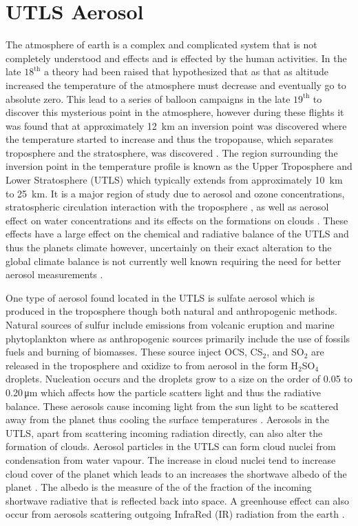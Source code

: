 \section{UTLS Aerosol}

The atmosphere of earth is a complex and complicated system that is not completely understood and effects and is effected by the human activities. In the late $18^{\text{th}}$ a theory had been raised that hypothesized that as that as altitude increased the temperature of the atmosphere must decrease and eventually go to absolute zero. This lead to a series of balloon campaigns in the late $19^{\text{th}}$ to discover this mysterious point in the atmosphere, however during these flights it was found that at approximately 12~km an inversion point was discovered where the temperature started to increase and thus the tropopause, which separates troposphere and the stratosphere, was discovered \citep{Hoinka1997}. The region surrounding the inversion point in the temperature profile is known as the Upper Troposphere and Lower Stratosphere (UTLS) which typically extends from approximately 10~km to 25~km. It is a major region of study due to aerosol and ozone concentrations, stratospheric circulation interaction with the troposphere \citep{Baldwin2007}, as well as aerosol effect on water concentrations and its effects on the formations on clouds \citep{Demott1997}. These effects have a large effect on the chemical and radiative balance of the UTLS and thus the planets climate \citep{McCormick1995,Solomon1999} however, uncertainly on their exact alteration to the global climate balance is not currently well known requiring the need for better aerosol measurements \citep{Solomon2007}.

One type of aerosol found located in the UTLS is sulfate aerosol which is produced in the troposphere though both natural and anthropogenic methods. Natural sources of sulfur include emissions from volcanic eruption and marine phytoplankton \citep{Bates1992} where as anthropogenic sources primarily include the use of fossils fuels and burning of biomasses. These source inject OCS, CS$_{2}$, and SO$_{2}$ are released in the troposphere and oxidize to from aerosol in the form H$_{2}$SO$_{4}$ droplets. Nucleation occurs and the droplets grow to a size on the order of 0.05 to 0.20\,\si{\micro\metre} \citep{Brock1995} which affects how the particle scatters light and thus the radiative balance. These aerosols cause incoming light from the sun light to be scattered away from the planet thus cooling the surface temperatures \citep{Dutton1992,Pollack1976}. Aerosols in the UTLS, apart from scattering incoming radiation directly, can also alter the formation of clouds. Aerosol particles in the UTLS can form cloud nuclei from condensation from water vapour. The increase in cloud nuclei tend to increase cloud cover of the planet which leads to an increases the shortwave albedo of the planet \citep{Charlson1992}. The albedo is the measure of the of the fraction of the incoming shortwave radiative that is reflected back into space. A greenhouse effect can also occur from aerosols scattering outgoing InfraRed (IR) radiation from the earth \citep{Kiehl1993}.

